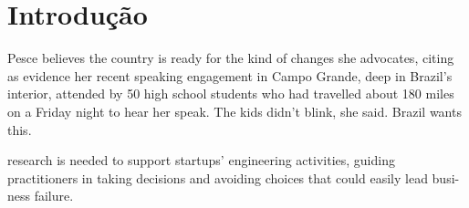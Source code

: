 \chapter{Introdução}
\label{cap-introducao}

Pesce believes the country is ready for the kind of changes she advocates, citing as evidence her recent speaking engagement in Campo Grande, deep in Brazil’s interior, attended by 50 high school students who had travelled about 180 miles on a Friday night to hear her speak. The kids didn’t blink, she said. Brazil wants this.



research is needed to
support startups’ engineering activities, guiding practitioners in
taking decisions and avoiding choices that could easily lead busi-ness failure.